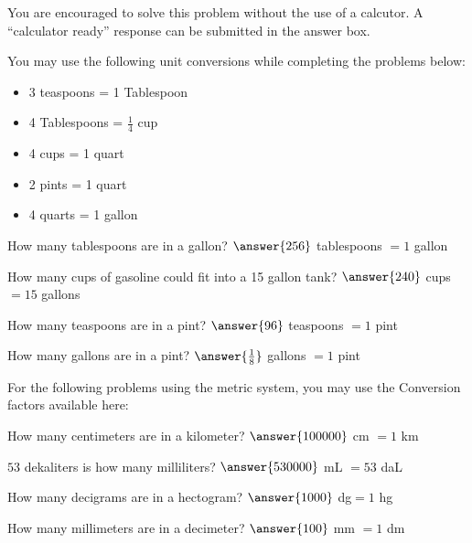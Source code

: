 \documentclass{ximera}
\author{David Kish}
\begin{document}
You are encouraged to solve this problem without the use of a calcutor. A ``calculator ready'' response can be submitted in the answer box.

You may use the following unit conversions while completing the problems below:
\begin{itemize}
\item 3 teaspoons = 1 Tablespoon
\item 4  Tablespoons = $\frac{1}{4}$ cup
\item 4 cups = 1 quart
\item 2 pints = 1 quart
\item 4 quarts = 1 gallon
\end{itemize}

\begin{exercise}
 How many tablespoons are in a gallon? 
 $\answer{256}$ tablespoons $= 1$ gallon
 \end{exercise}
  \begin{exercise}
 How many cups of gasoline could fit into a 15 gallon tank?
 $\answer{240}$ cups $= 15$ gallons
 \end{exercise}
  \begin{exercise}
 How many teaspoons are in a pint?
 $\answer{96}$ teaspoons $= 1$ pint
 \end{exercise}
  \begin{exercise}
 How many gallons are in a pint?
 $\answer{\frac{1}{8}}$ gallons $=1 $ pint
 \end{exercise}

For the following problems using the metric system, you may use the Conversion factors available here: 

  \begin{exercise}
 How many centimeters are in a kilometer? 
 $\answer{100000}$ cm $= 1$ km
 \end{exercise}
   \begin{exercise}
 $53$ dekaliters is how many milliliters?
 $\answer{530000}$ mL $= 53$ daL
 \end{exercise}
   \begin{exercise}
 How many decigrams are in a hectogram? 
$ \answer{1000}$ dg$ = 1$ hg
 \end{exercise}
   \begin{exercise}
 How many millimeters are in a decimeter?
 $\answer{100}$ mm $= 1$ dm
 \end{exercise}
\end{document}
